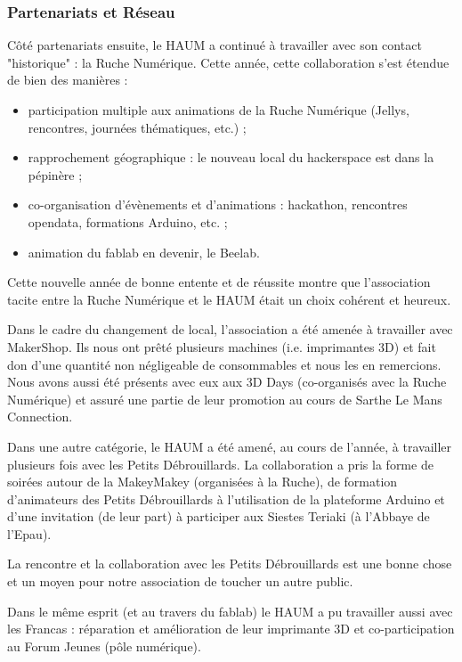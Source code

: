 \documentclass[a4paper, 11pt]{article}
\begin{document}
\subsubsection{Partenariats et Réseau}


Côté partenariats ensuite, le HAUM a continué à travailler avec son contact "historique" : la Ruche Numérique. Cette année, cette collaboration s'est étendue de bien des manières :

\begin{itemize}
    \item participation multiple aux animations de la Ruche Numérique (Jellys, rencontres, journées thématiques, etc.) ;
    \item rapprochement géographique : le nouveau local du hackerspace est dans la pépinère ;
    \item co-organisation d'évènements et d'animations : hackathon, rencontres opendata, formations Arduino, etc. ;
    \item animation du fablab en devenir, le Beelab.
\end{itemize}

Cette nouvelle année de bonne entente et de réussite montre que l'association tacite entre la Ruche Numérique et le HAUM était un choix cohérent et heureux.

Dans le cadre du changement de local, l'association a été amenée à travailler avec MakerShop. Ils nous ont prêté plusieurs machines (i.e. imprimantes 3D) et fait don d'une quantité non négligeable de consommables et nous les en remercions. Nous avons aussi été présents avec eux aux 3D Days (co-organisés avec la Ruche Numérique) et assuré une partie de leur promotion au cours de Sarthe Le Mans Connection.

Dans une autre catégorie, le HAUM a été amené, au cours de l'année, à travailler plusieurs fois avec les Petits Débrouillards. La collaboration a pris la forme de soirées autour de la MakeyMakey (organisées à la Ruche), de formation d'animateurs des Petits Débrouillards à l'utilisation de la plateforme Arduino et d'une invitation (de leur part) à participer aux Siestes Teriaki (à l'Abbaye de l'Epau).

La rencontre et la collaboration avec les Petits Débrouillards est une bonne chose et un moyen pour notre association de toucher un autre public.

Dans le même esprit (et au travers du fablab) le HAUM a pu travailler aussi avec les Francas : réparation et amélioration de leur imprimante 3D et co-participation au Forum Jeunes (pôle numérique).
\end{document}
